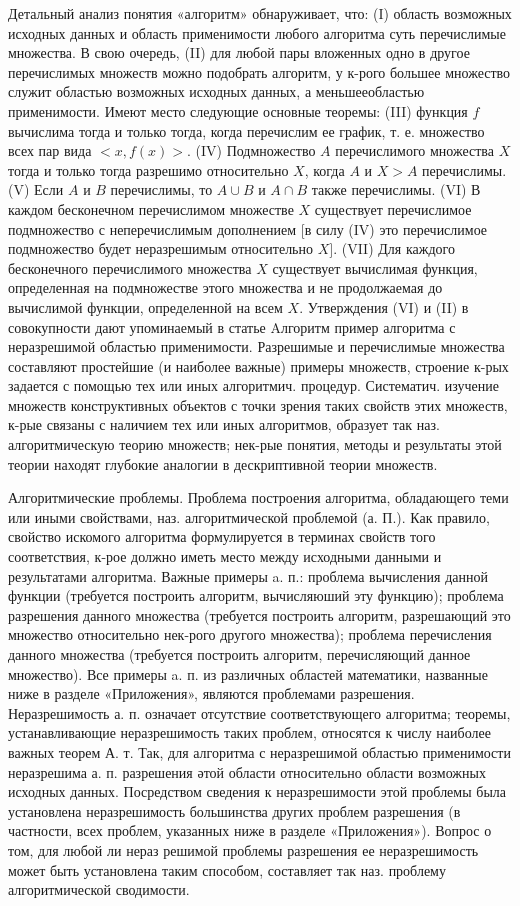 \documentclass[10pt]{article}
\begin{document}
Детальный анализ понятия «алгоритм» обнаруживает, что: (I) область возможных исходных данных и область применимости любого алгоритма суть перечислимые множества. В свою очередь, (II) для любой пары вложенных одно в другое перечислимых множеств можно подобрать алгоритм, у к-рого большее множество служит областью возможных исходных данных, а меньшееобластью применимости. Имеют место следующие основные теоремы: (III) функция $f$ вычислима тогда и только тогда, когда перечислим ее график, т. е. множество всех пар вида $<x, f(x)>$. (IV) Подмножество $A$ перечислимого множества $X$ тогда и только тогда разрешимо относительно $X$, когда $A$ и $X>A$ перечислимы. (V) Если $A$ и $B$ перечислимы, то $A \cup B$ и $A \cap B$ также перечислимы. (VI) В каждом бесконечном перечислимом множестве $X$ существует перечислимое подмножество с неперечислимым дополнением [в силу (IV) это перечислимое подмножество будет неразрешимым относительно $X]$. (VII) Для каждого бесконечного перечислимого множества $X$ существует вычислимая функция, определенная на подмножестве этого множества и не продолжаемая до вычислимой функции, определенной на всем $X$. Утверждения (VI) и (II) в совокупности дают упоминаемый в статье Aлгоритм пример алгоритма с неразрешимой областью применимости. Разрешимые и перечислимые множества составляют простейшие (и наиболее важные) примеры множеств, строение к-рых задается с помощью тех или иных алгоритмич. процедур. Систематич. изучение множеств конструктивных объектов с точки зрения таких свойств этих множеств, к-рые связаны с наличием тех или иных алгоритмов, образует так наз. алгоритмическую теорию множеств; нек-рые понятия, методы и результаты этой теории находят глубокие аналогии в дескриптивной теории множеств.



Алгоритмические проблемы. Проблема построения алгоритма, обладающего теми или иными свойствами, наз. алгоритмической проблемой (а. П.). Как правило, свойство искомого алгоритма формулируется в терминах свойств того соответствия, к-рое должно иметь место между исходными данными и результатами алгоритма. Важные примеры a. п.: проблема вычисления данной функции (требуется построить алгоритм, вычисляюший эту функцию); проблема разрешения данного множества (требуется построить алгоритм, разрешающий это множество относительно нек-рого другого множества); проблема перечисления данного множества (требуется построить алгоритм, перечисляющий данное множество). Все примеры a. п. из различных областей математики, названные ниже в разделе «Приложения», являются проблемами разрешения. Неразрешимость а. п. означает отсутствие соответствующего алгоритма; теоремы, устанавливающие неразрешимость таких проблем, относятся к числу наиболее важных теорем А. т. Так, для алгоритма с неразрешимой областью применимости неразрешима а. п. разрешения әтой области относительно области возможных исходных данных. Посредством сведения к неразрешимости этой проблемы была установлена неразрешимость большинства других проблем разрешения (в частности, всех проблем, указанных ниже в разделе «Приложения»). Вопрос о том, для любой ли нераз решимой проблемы разрешения ее неразрешимость может быть установлена таким способом, составляет так наз. проблему алгоритмической сводимости.
\end{document}
